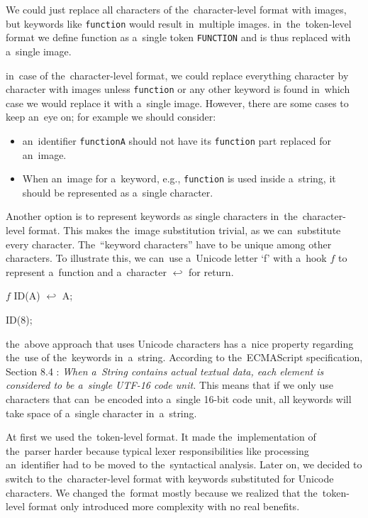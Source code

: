 We could just replace all characters of the~character-level format with images, but keywords like \texttt{function} would result in~multiple images. in~the~token-level
format we define function as a~single token \texttt{FUNCTION} and is thus replaced with a~single image.

in~case of the~character-level format, we could replace everything character by character with images unless \texttt{function} or any other keyword is found in~which
case we would replace it with a~single image. However, there are some cases to keep an~eye on; for example we should consider:
\begin{itemize}
    \item an~identifier \texttt{functionA} should not have its \texttt{function} part replaced for an~image.
    \item When an~image for a~keyword, e.g., \texttt{function} is used inside a~string, it should be represented as a~single character.
\end{itemize}

Another option is to represent keywords as single characters in~the~character-level format. This makes the~image substitution trivial, as we can~substitute
every character. The~``keyword characters'' have to be unique among other characters. To illustrate this, we can~use a~Unicode letter `f' with a~hook $f$
to represent a~function and a~character $\hookleftarrow$ for return.
\begin{code}
$f$ ID(A) {
    $\hookleftarrow$ A;
}

ID(8);
\end{code}

the~above approach that uses Unicode characters has a~nice property regarding the~use of the~keywords in~a~string. According to the~ECMAScript specification,
Section 8.4 \cite{Ecmascript}: \emph{When a~String contains actual textual data, each element is considered to be a~single UTF-16 code unit.} This means that if we
only use characters that can~be encoded into a~single 16-bit code unit, all keywords will take space of a~single character in~a~string.

At first we used the~token-level format. It made the~implementation of the~parser harder because typical lexer responsibilities like processing
an~identifier had to be moved to the~syntactical analysis. Later on, we decided to switch to the~character-level format with keywords substituted for
Unicode characters. We changed the~format mostly because we realized that the~token-level format only introduced more complexity with no real benefits.

